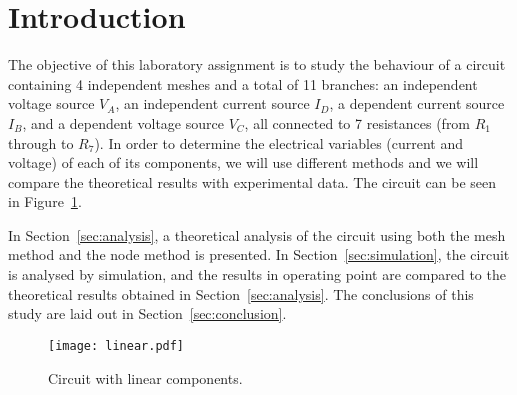 \section{Introduction}
\label{sec:introduction}

The objective of this laboratory assignment is to study the behaviour of a circuit containing 4 independent meshes and a total of 11 branches: an independent voltage source $V_A$, an independent current source $I_D$, a dependent current source $I_B$, and a dependent voltage source $V_C$, all connected to 7 resistances (from $R_1$ through to $R_7$). In order to determine the electrical variables (current and voltage) of each of its components, we will use different methods and we will compare the theoretical results with experimental data. The circuit can be seen in Figure~\ref{fig:rc}.

In Section~\ref{sec:analysis}, a theoretical analysis of the circuit using both the mesh method and the node method is
presented. In Section~\ref{sec:simulation}, the circuit is analysed by
simulation, and the results in operating point are compared to the theoretical results obtained in
Section~\ref{sec:analysis}. The conclusions of this study are laid out in
Section~\ref{sec:conclusion}.

\begin{figure}[h] \centering
\texttt{[image: linear.pdf]}
\caption{Circuit with linear components.}
\label{fig:rc}
\end{figure}

